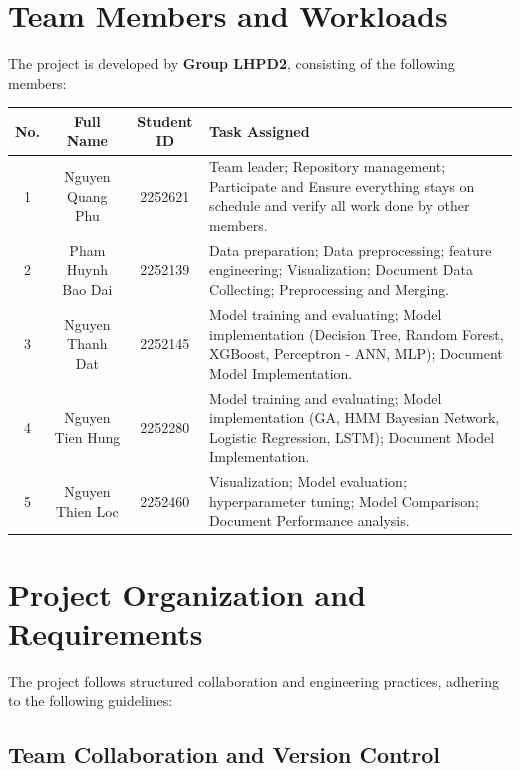 \section{Team Members and Workloads}

The project is developed by \textbf{Group LHPD2}, consisting of the following members:

\begin{center}
    \renewcommand{\arraystretch}{1.5}
    \begin{tabularx}{\textwidth}{||c|c|c|X||}
    \hline
    \textbf{No.} & \textbf{Full Name} & \textbf{Student ID} & \textbf{Task Assigned} \\
    \hline
    1 & Nguyen Quang Phu & 2252621 & Team leader; Repository management; Participate and Ensure everything stays on schedule and verify all work done by other members. \\
    \hline
    2 & Pham Huynh Bao Dai & 2252139 & Data preparation; Data preprocessing; feature engineering; Visualization; Document Data Collecting; Preprocessing and Merging. \\
    \hline
    3 & Nguyen Thanh Dat & 2252145 & Model training and evaluating; Model implementation (Decision Tree, Random Forest, XGBoost, Perceptron - ANN, MLP); Document Model Implementation.  \\
    \hline
    4 & Nguyen Tien Hung & 2252280 & Model training and evaluating; Model implementation (GA, HMM Bayesian Network, Logistic Regression, LSTM); Document Model Implementation. \\
    \hline
    5 & Nguyen Thien Loc & 2252460 & Visualization; Model evaluation; hyperparameter tuning; Model Comparison; Document Performance analysis.  \\
    \hline
    \end{tabularx}
\end{center} 

\section{Project Organization and Requirements}

The project follows structured collaboration and engineering practices, adhering to the following guidelines:

\subsection{Team Collaboration and Version Control}

